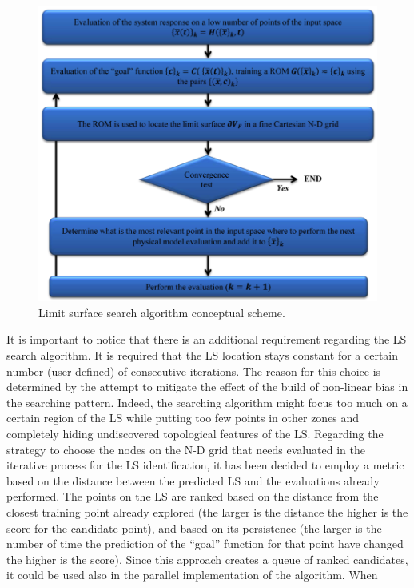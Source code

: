 \begin{figure}[h!]
  \centering
  \includegraphics[width=1.0\textwidth]  {pics/LimitSurfaceAlgoFlow.png}
  \caption{Limit surface search algorithm conceptual scheme.}
  \label{fig:LimitSurfaceAlgoFlow}
\end{figure}
It is important to notice that there is an additional requirement 
regarding the LS search algorithm. It is required that the LS location 
stays constant for a certain number (user defined) of consecutive 
iterations. The reason for this choice is determined by the attempt to 
mitigate the effect of the build of non-linear bias in the searching 
pattern. Indeed, the searching algorithm might focus too much on a 
certain region of the LS while putting too few points in other zones 
and completely hiding undiscovered topological features of the LS.
Regarding the strategy to choose the nodes on the N-D grid that 
needs evaluated in the iterative process for the LS identification, it has
been decided to employ a metric based on the 
distance between the predicted LS and the evaluations already 
performed. The points on the LS are ranked based on the distance 
from the closest training point already explored (the larger is the 
distance the higher is the score for the candidate point), and based on 
its persistence (the larger is the number of time the prediction of the 
``goal'' function for that point have changed the higher is the score).
Since this approach creates a queue of ranked candidates, it could be 
used also in the parallel implementation of the algorithm. When 
